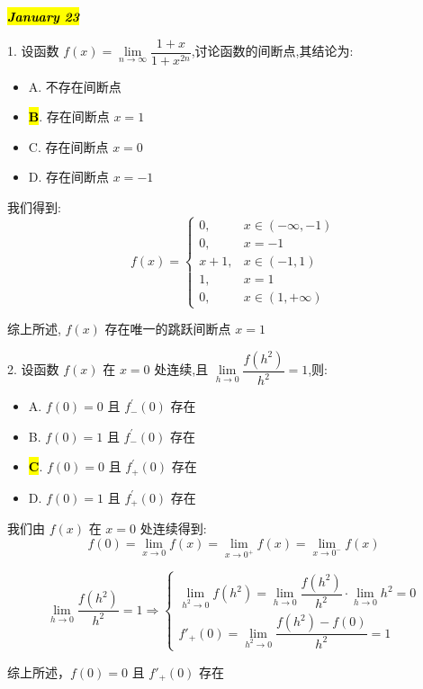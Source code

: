 \hl{\textbf{\textit{January 23}}}

1. 设函数 $f(x)=\lim\limits_{n\to \infty}\dfrac{1+x}{1+x^{2n}}$,讨论函数的间断点,其结论为:
\begin{itemize}
	\item A. 不存在间断点
	\item \hl{\textbf{B}}. 存在间断点 $x=1$
	\item C. 存在间断点 $x=0$
	\item D. 存在间断点 $x=-1$
\end{itemize}
\begin{solution}

	我们得到:$$f(x) = \begin{cases}
	0, & x\in(-\infty,-1)\\
	0, & x = -1\\
	x+1, & x\in(-1,1)\\
	1, & x = 1\\
	0, & x\in(1,+\infty)
	\end{cases}$$

	综上所述, $f(x)$ 存在唯一的跳跃间断点 $x = 1$
\end{solution}

2. 设函数 $f(x)$ 在 $x=0$ 处连续,且 $\lim\limits_{h\to 0}\dfrac{f(h^{2})}{h^{2}}=1$,则:
\begin{itemize}
	\item A. $f(0)=0$ 且 $f_{-}^{'}(0)$ 存在
	\item B. $f(0)=1$ 且 $f_{-}^{'}(0)$ 存在
	\item \hl{\textbf{C}}. $f(0)=0$ 且 $f_{+}^{'}(0)$ 存在
	\item D. $f(0)=1$ 且 $f_{+}^{'}(0)$ 存在
\end{itemize}
\begin{solution}

	我们由 $f(x)$ 在 $x=0$ 处连续得到:
	$$f(0) = \lim\limits_{x\to 0}f(x) = \lim\limits_{x\to 0^{+}}f(x) = \lim\limits_{x\to 0^{-}}f(x)$$

	$$\lim\limits_{h\to 0}\dfrac{f(h^{2})}{h^{2}}=1\Rightarrow 
	\begin{cases}
		\lim\limits_{h^{2}\to 0}f(h^{2}) = \lim\limits_{h\to 0}\dfrac{f(h^{2})}{h^{2}}\cdot \lim\limits_{h\to 0}h^{2}=0\\
		f'_{+}(0) = \lim\limits_{h^{2}\to 0}\dfrac{f(h^{2})-f(0)}{h^{2}}=1
	\end{cases}$$

	综上所述，$f(0) = 0$ 且 $f'_{+}(0)$ 存在 
\end{solution}

